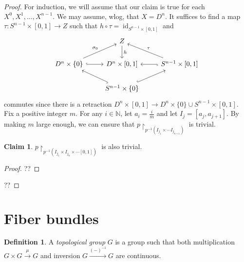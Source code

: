 \documentclass[10pt,letterpaper,cm]{nupset}
\theoremstyle{definition}
\newtheorem{defn}{Definition}[subsection]
\theoremstyle{theorem}
\newtheorem*{claim}{Claim}
\theoremstyle{remark}
\newcommand{\N}{\mathbb N}
\newcommand{\1}{\mathbb{1}}
\newcommand{\0}{\vec 0}
\DeclareMathOperator{\id}{id}
\begin{document}
\begin{proof}
For induction, we will assume that our claim is true for each $X^0, X^1, \ldots, X^{n-1}$. We may assume, wlog, that $X = D^n$. It suffices to find a map $\tau : S^{n-1} \times [0,1] \to Z$ such that $h \circ \tau = \id_{S^{n-1}\times [0,1]}$ and
\[
\begin{tikzcd}
                                                        & Z \arrow[d, "h"]                                       &                                                           \\
D^n \times \{0\} \arrow[r, hook] \arrow[ru, "\sigma_0"] & {D^n \times [0,1]}                                     & {S^{n-1}\times [0,1]} \arrow[l, hook] \arrow[lu, "\tau"'] \\
                                                        & S^{n-1} \times \{0\} \arrow[lu, hook] \arrow[ru, hook] &                                                          
\end{tikzcd}
\] commutes since there is a retraction $D^n \times [0,1] \to D^{n} \times \{0\} \cup S^{n-1}\times [0,1]$. Fix a positive integer $m$. For any $i\in \N$, let $a_i = \frac{i}{m}$ and let $I_j = [a_j, a_{j+1}]$. By making $m$ large enough, we can ensure that $p\restriction_{p^{-1}(I_{j_1} \times \cdots I_{j_{n+1}})}$ is trivial. 
\begin{claim}
$p\restriction_{p^{-1}(I_{j_1} \times I_{j_n} \times \cdots [0,1])}$ is also trivial. 
\end{claim}
\begin{proof}
??
\end{proof}
?? 
\end{proof}


\section{Fiber bundles}

\begin{defn}
A \textit{topological group} $G$ is a group such that both multiplication $G \times G \overset{\mu}{\longrightarrow} G$ and inversion $G \overset{({-})^{-1}}{\longrightarrow} G$ are continuous.
\end{defn}
\end{document}
